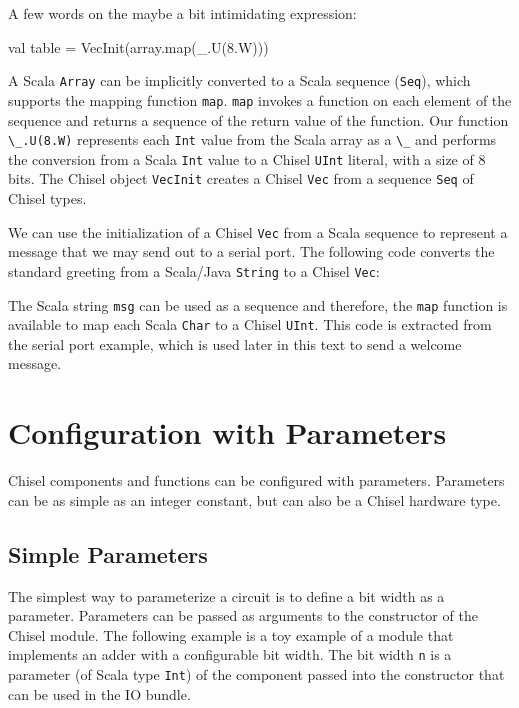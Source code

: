\documentclass[%
    10pt,
    headinclude, footexclude,
    openright, %
    notitlepage,
    cleardoubleempty,
    headsepline,
    pointlessnumbers,
    bibtotoc, idxtotoc,
    ]{scrbook}
\newcommand{\code}[1]{{\lstinline[basicstyle=\small\ttfamily]{#1}}}
\begin{document}

A few words on the maybe a bit intimidating expression:
\begin{chisel}
  val table = VecInit(array.map(_.U(8.W)))
\end{chisel}


\noindent A Scala \code{Array} can be implicitly converted to a Scala sequence (\code{Seq}),
which supports the mapping function \code{map}.
\code{map} invokes a function on each element of the sequence and returns
a sequence of the return value of the function. Our function \code{\_.U(8.W)} represents
each \code{Int} value from the Scala array as a \code{\_} and performs the conversion
from a Scala \code{Int} value to a Chisel \code{UInt} literal, with a size of 8 bits.
The Chisel object \code{VecInit} creates a Chisel \code{Vec} from a sequence \code{Seq}
of Chisel types.

We can use the initialization of a Chisel \code{Vec} from a Scala sequence to represent
a message that we may send out to a serial port. The following code converts the standard greeting
from a Scala/Java \code{String} to a Chisel \code{Vec}:


\noindent The Scala string \code{msg} can be used as a sequence and therefore, the \code{map}
function is available to map each Scala \code{Char} to a Chisel \code{UInt}.
This code is extracted from the serial port example, which is used later in this text to send a welcome message.

\section{Configuration with Parameters}

Chisel components and functions can be configured with parameters.
Parameters can be as simple as an integer constant, but can also be a Chisel
hardware type.

\subsection{Simple Parameters}

The simplest way to parameterize a circuit is to define a bit width as a parameter.
Parameters can be passed as arguments to
the constructor of the Chisel module. The following example is a toy example of
a module that implements an adder with a configurable bit width.
The bit width \code{n} is a parameter (of Scala type \code{Int}) of the component
passed into the constructor that can be used in the IO bundle.
\end{document}
